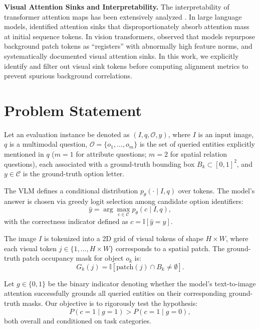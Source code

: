 \documentclass{article}
\begin{document}
\textbf{Visual Attention Sinks and Interpretability.}
The interpretability of transformer attention maps has been extensively analyzed \citep{jain2019attention, wiegreffe2019attention}. In large language models, \citet{xiao2024efficient} identified attention sinks that disproportionately absorb attention mass at initial sequence tokens. In vision transformers, \citet{darcet2024vision} observed that models repurpose background patch tokens as ``registers'' with abnormally high feature norms, and \citet{kang2025visual} systematically documented visual attention sinks. In this work, we explicitly identify and filter out visual sink tokens before computing alignment metrics to prevent spurious background correlations.

\section{Problem Statement}

Let an evaluation instance be denoted as $(I, q, \mathcal{O}, y)$, where $I$ is an input image, $q$ is a multimodal question, $\mathcal{O} = \{o_1, \dots, o_m\}$ is the set of queried entities explicitly mentioned in $q$ ($m=1$ for attribute questions; $m=2$ for spatial relation questions), each associated with a ground-truth bounding box $B_k \subset [0, 1]^2$, and $y \in \mathcal{C}$ is the ground-truth option letter.

The VLM defines a conditional distribution $p_\theta(\cdot \mid I, q)$ over tokens. The model's answer is chosen via greedy logit selection among candidate option identifiers:
\begin{equation}
    \hat{y} = \arg\max_{c \in \mathcal{C}} p_\theta(c \mid I, q),
\end{equation}
with the correctness indicator defined as $c = \mathbb{I}[\hat{y} = y]$.

The image $I$ is tokenized into a 2D grid of visual tokens of shape $H \times W$, where each visual token $j \in \{1, \dots, H \times W\}$ corresponds to a spatial patch. The ground-truth patch occupancy mask for object $o_k$ is:
\begin{equation}
    G_k(j) = \mathbb{I}[\text{patch}(j) \cap B_k \neq \emptyset].
\end{equation}

Let $g \in \{0, 1\}$ be the binary indicator denoting whether the model's text-to-image attention successfully grounds all queried entities on their corresponding ground-truth masks. Our objective is to rigorously test the hypothesis:
\begin{equation}
    P(c = 1 \mid g = 1) > P(c = 1 \mid g = 0),
\end{equation}
both overall and conditioned on task categories.
\end{document}
